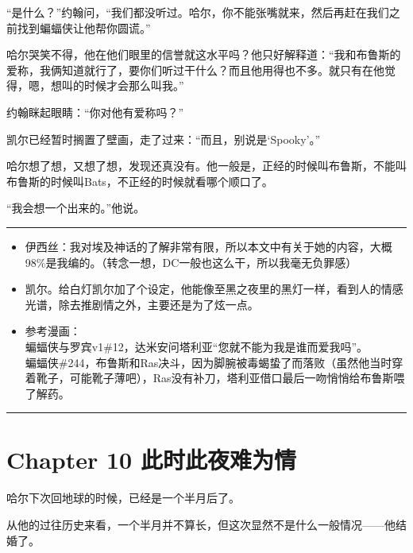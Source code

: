 \documentclass[../main]{subfiles}
\begin{document}
“是什么？”约翰问，“我们都没听过。哈尔，你不能张嘴就来，然后再赶在我们之前找到蝙蝠侠让他帮你圆谎。”

哈尔哭笑不得，他在他们眼里的信誉就这水平吗？他只好解释道：“我和布鲁斯的爱称，我俩知道就行了，要你们听过干什么？而且他用得也不多。就只有在他觉得，嗯，想叫的时候才会那么叫我。”

约翰眯起眼睛：“你对他有爱称吗？”

凯尔已经暂时搁置了壁画，走了过来：“而且，别说是`Spooky'。”

哈尔想了想，又想了想，发现还真没有。他一般是，正经的时候叫布鲁斯，不能叫布鲁斯的时候叫Bats，不正经的时候就看哪个顺口了。

“我会想一个出来的。”他说。

\begin{center}\rule{0.5\linewidth}{0.5pt}\end{center}

\begin{itemize}
    \item
          伊西丝：我对埃及神话的了解非常有限，所以本文中有关于她的内容，大概98\%是我编的。（转念一想，DC一般也这么干，所以我毫无负罪感）
    \item
          凯尔。给白灯凯尔加了个设定，他能像至黑之夜里的黑灯一样，看到人的情感光谱，除去推剧情之外，主要还是为了炫一点。
    \item
          参考漫画：\\
          蝙蝠侠与罗宾v1\#12，达米安问塔利亚“您就不能为我是谁而爱我吗”。\\
          蝙蝠侠\#244，布鲁斯和Ra\textquotesingle s决斗，因为脚腕被毒蝎蛰了而落败（虽然他当时穿着靴子，可能靴子薄吧），Ra\textquotesingle s没有补刀，塔利亚借口最后一吻悄悄给布鲁斯喂了解药。
\end{itemize}

\begin{center}\rule{0.5\linewidth}{0.5pt}\end{center}

\hypertarget{chapter-10-ux6b64ux65f6ux6b64ux591cux96beux4e3aux60c5}{%
    \section{Chapter 10
      此时此夜难为情}\label{chapter-10-ux6b64ux65f6ux6b64ux591cux96beux4e3aux60c5}}

哈尔下次回地球的时候，已经是一个半月后了。

从他的过往历史来看，一个半月并不算长，但这次显然不是什么一般情况——他结婚了。
\end{document}
